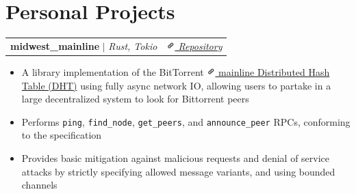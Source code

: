 \documentclass[letterpaper, 10pt]{report}
\makeatletter
\newcommand{\resumeSubheading}[4]{
    \begin{tabular*}{\textwidth}[t]{l@{\extracolsep{\fill}}r}
        \textbf{#1}       & #2                \\
        \textit{\small#3} & \textit{\small#4} \\
    \end{tabular*}\vspace{-0.7em}
}
\newcommand{\resumeProjectHeading}[2]{
    \begin{tabular*}{\textwidth}{l@{\extracolsep{\fill}}r}
        \small#1 & #2 \\
    \end{tabular*}\vspace{-1.5em}
}
\newenvironment{ResumeItem}{
    \vspace{-0.3em}
    \begin{itemize}
        \setlength\itemsep{-0.3em}
        }{
    \end{itemize}\vspace{-0.3em}}
\newcommand{\cxx}{C\nolinebreak\hspace{-.05em}\raisebox{0.03ex}{\bf +}\nolinebreak\hspace{-.05em}\raisebox{.03ex}{\bf +}}
\newcommand{\linkIcon}{\includegraphics[height=9pt, trim=0 5cm 0 -1.5cm]{./img/link-icon}}
\makeatother
\begin{document}


\section{Personal Projects}
\resumeProjectHeading
{\textbf{midwest\_mainline} \(|\) \emph{Rust, Tokio}}{\href{https://github.com/Internal-Compiler-Error/midwest_mainline}{\textit{{\includegraphics[height=9pt, trim=0 5cm 0 -1.5cm]{link-icon} Repository}}}}

\begin{ResumeItem}
    \item{A library implementation of the BitTorrent \href{https://www.bittorrent.org/beps/bep_0005.html}{\linkIcon{} mainline Distributed Hash Table (DHT)} using fully async network IO, allowing users to partake in a large decentralized system to look for Bittorrent peers}
    \item{Performs \texttt{ping}, \texttt{find\_node}, \texttt{get\_peers}, and \texttt{announce\_peer} RPCs, conforming to the specification}
    \item{Provides basic mitigation against malicious requests and denial of service attacks by strictly specifying allowed message variants, and using bounded channels}
\end{ResumeItem}

\end{document}
